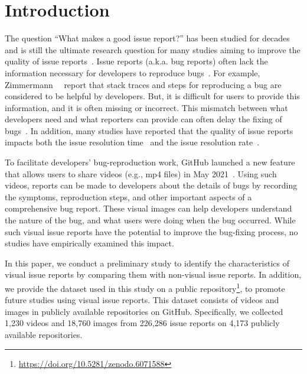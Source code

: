 \section{Introduction}
\label{sec:intro}
The question ``What makes a good issue report?'' has been studied for decades and is still the ultimate research question for many studies aiming to improve the quality of issue reports~\citep{DBLP:conf/eclipse/BettenburgJSWPZ07}\citep{DBLP:conf/icse/HerzigJZ13}\citep{zimmermann2010TSE}. Issue reports (a.k.a. bug reports) often lack the information necessary for developers to reproduce bugs~\citep{DearGitHub}\citep{DBLP:conf/msr/JoorabchiMM14}. 
For example, Zimmermann~\et~\citep{zimmermann2010TSE} report that stack traces and steps for reproducing a bug are considered to be helpful by developers. But, it is difficult for users to provide this information, and it is often missing or incorrect. 
This mismatch between what developers need and what reporters can provide can often delay the fixing of bugs~\citep{DBLP:conf/msr/JoorabchiMM14}. In addition, many studies have reported that the quality of issue reports impacts both the issue resolution time~\citep{DBLP:conf/cscw/BreuPSZ10}\citep{DBLP:conf/icse/GuoZNM10} and the issue resolution rate~\citep{DBLP:conf/icse/ZimmermannNGM12}\citep{DBLP:conf/compsac/ZouXZCL15}. 

To facilitate developers' bug-reproduction work, GitHub launched a new feature that allows users to share videos (e.g., mp4 files) in May 2021~\citep{github-video-blog}. Using such videos, reports can be made to developers about the details of bugs by recording the symptoms, reproduction steps, and other important aspects of a comprehensive bug report. These visual images can help developers understand the nature of the bug, and what users were doing when the bug occurred. While such visual issue reports have the potential to improve the bug-fixing process, no studies have empirically examined this impact. 

In this paper, we conduct a preliminary study to identify the characteristics of visual issue reports by comparing them with non-visual issue reports.  In addition, we provide the dataset used in this study on a public repository\footnote{\url{https://doi.org/10.5281/zenodo.6071588}}, to promote future studies using visual issue reports. This dataset consists of videos and images in publicly available repositories on GitHub. Specifically, we collected 1,230 videos and 18,760 images from 226,286 issue reports on 4,173 publicly available repositories.


